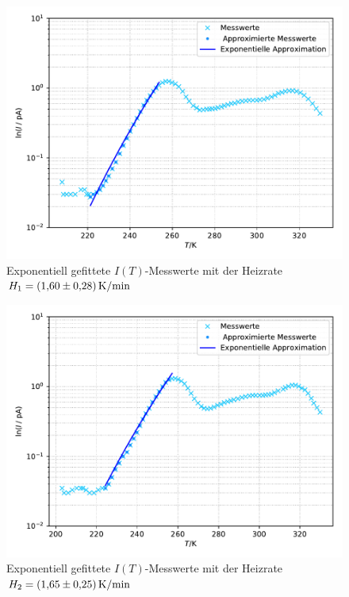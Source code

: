 \begin{figure}[H]
  \centering
  \includegraphics[scale=0.75]{content/plot1.pdf}
  \caption{Exponentiell gefittete $I(T)$-Messwerte mit der Heizrate $H_1 = \SI{1.60 +- 0.28}{\kelvin\per\minute}$}
  \label{fig:plot1}
\end{figure}

\begin{figure}[H]
  \centering
  \includegraphics[scale=0.75]{content/plot2.pdf}
  \caption{Exponentiell gefittete $I(T)$-Messwerte mit der Heizrate $H_2 = \SI{1.65 +- 0.25}{\kelvin\per\minute}$}
  \label{fig:plot2}
\end{figure}


